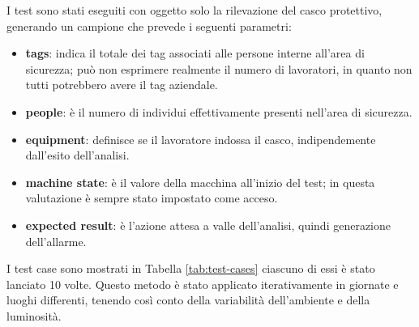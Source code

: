 I test sono stati eseguiti con oggetto solo la rilevazione del casco protettivo, generando un campione che prevede i seguenti parametri:

\begin{itemize}
	\item \textbf{tags}: indica il totale dei tag associati alle persone interne all'area di sicurezza; può non esprimere realmente il numero di lavoratori, in quanto non tutti potrebbero avere il tag aziendale.
	\item \textbf{people}: è il numero di individui effettivamente presenti nell'area di sicurezza. 
	\item \textbf{equipment}: definisce se il lavoratore indossa il casco, indipendemente dall'esito dell'analisi.
	\item \textbf{machine state}: è il valore della macchina all'inizio del test; in questa valutazione è sempre stato impostato come acceso.
	\item \textbf{expected result}: è l'azione attesa a valle dell'analisi, quindi generazione dell'allarme. 
	
\end{itemize}	

I test case sono mostrati in Tabella \ref{tab:test-cases} ciascuno di essi è stato lanciato 10 volte. Questo metodo è stato applicato iterativamente in giornate e luoghi differenti, tenendo così conto della variabilità dell'ambiente e della luminosità.  


